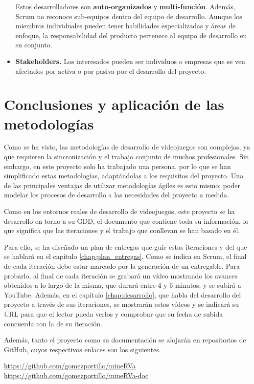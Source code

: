 \begin{itemize}
Estos desarrolladores son \textbf{auto-organizados} y \textbf{multi-función}. Además, Scrum no reconoce sub-equipos dentro del equipo de desarrollo. Aunque los miembros individuales pueden tener habilidades especializadas y áreas de enfoque, la responsabilidad del producto pertenece al equipo de desarrollo en su conjunto.

\item \textbf{Stakeholders.} Los interesados pueden ser individuos o empresas que se ven afectados por activa o por pasiva por el desarrollo del proyecto.

\end{itemize}

\section{Conclusiones y aplicación de las metodologías}

Como se ha visto, las metodologías de desarrollo de videojuegos son complejas, ya que requieren la sincronización y el trabajo conjunto de muchos profesionales. Sin embargo, en este proyecto solo ha trabajado una persona, por lo que se han simplificado estas metodologías, adaptándolas a los requisitos del proyecto. Una de las principales ventajas de utilizar metodologías ágiles es esto mismo; poder modelar los procesos de desarrollo a las necesidades del proyecto a medida. 

Como en los entornos reales de desarrollo de videojuegos, este proyecto se ha desarrollo en torno a su \acs{GDD}, el documento que contiene toda su información, lo que significa que las iteraciones y el trabajo que conllevan se han basado en él.

Para ello, se ha diseñado un plan de entregas que guíe estas iteraciones y del que se hablará en el capítulo \ref{chap:plan_entregas}. Como se indica en Scrum, el final de cada iteración debe estar marcado por la generación de un entregable. Para probarlo, al final de cada iteración se grabará un vídeo mostrando los avances obtenidos a lo largo de la misma, que durará entre 4 y 6 minutos, y se subirá a YouTube. Además, en el capítulo \ref{chap:desarrollo}, que habla del desarrollo del proyecto a través de sus iteraciones, se mostrarán estos vídeos y se indicará su URL para que el lector pueda verlos y comprobar que su fecha de subida concuerda con la de su iteración.

Además, tanto el proyecto como su documentación se alojarán en repositorios de GitHub, cuyos respectivos enlaces son los siguientes.

\begin{center}
    \url{https://github.com/gomezportillo/mineRVa}
    \url{https://github.com/gomezportillo/mineRVa-doc}
\end{center}
